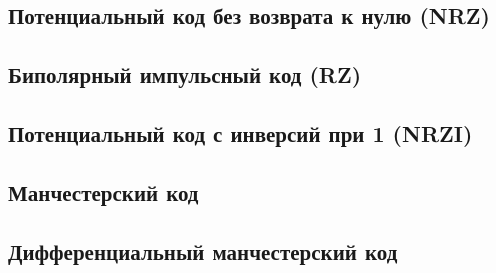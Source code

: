 \subsection{Потенциальный код без возврата к нулю (NRZ)}




\subsection{Биполярный импульсный код (RZ)}




\subsection{Потенциальный код с инверсий при 1 (NRZI)}




\subsection{Манчестерский код}




\subsection{Дифференциальный манчестерский код}



%
% 
% 
